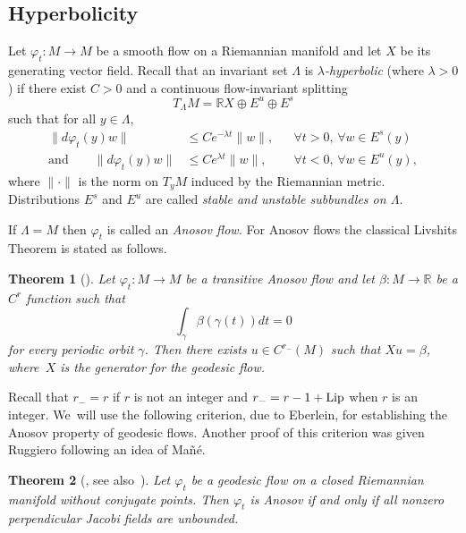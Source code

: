 \documentclass[10pt]{amsart}
\newtheorem{theorem}{Theorem}[section]
\theoremstyle{definition}
\newcommand{\field}[1]{\mathbb{#1}}
\newcommand{\R}{\field{R}}
\let\phi\varphi
\renewcommand{\>}{{\rangle}}
\newcommand{\<}{{\langle}}
\begin{document}
\subsection{Hyperbolicity} Let $\phi_t\colon M\to M$ be a smooth flow on a Riemannian manifold and let $X$ be its generating vector field.
Recall that an invariant set $\Lambda$ is \textit{$\lambda$-hyperbolic} (where $\lambda>0$) if there exist $C>0$ and a continuous flow-invariant splitting
\begin{equation*}
T_\Lambda M = \mathbb R X\oplus E^u\oplus E^s
\end{equation*}
such that for all $y\in\Lambda$,
\begin{equation}
\begin{aligned}
\|d\phi_t(y)w\|&\leq Ce^{-\lambda t}\|w\|, &&\forall t>0,\, \forall w\in E^s(y)\label{su_exp}\\
\text{and} \qquad\|d\phi_t(y)w\|&\leq Ce^{\lambda t}\|w\|, &&\forall t<0,\, \forall w\in E^u(y),
\end{aligned}
\end{equation}
where $\|{\cdot}\|$ is the norm on $T_yM$ induced by the Riemannian metric.
Distributions $E^s$ and $E^u$ are called \textit{stable and unstable subbundles on $\Lambda$}.

If $\Lambda=M$ then $\phi_t$ is called an {\it Anosov flow.} For Anosov flows the classical Livshits Theorem is stated as follows.
\begin{theorem}[\cite{L71, LMM86}]
\label{Liv}
Let $\varphi_t\colon M\to M$ be a transitive Anosov flow and let $\beta\colon M\to\R$ be a $C^r$ function such that
\[
\int_\gamma\beta(\gamma(t))dt=0
\]
for every periodic orbit $\gamma$. Then there exists $u\in C^{r_-}(M)$ such that $Xu=\beta$, where~$X$ is the generator for the geodesic flow.
\end{theorem}

Recall that $r_-=r$ if $r$ is not an integer and $r_-=r-1+\textup{Lip}$ when $r$ is an integer. We~will use the following criterion, due to Eberlein, for establishing the Anosov property of geodesic flows. Another proof of this criterion was given Ruggiero \cite{R07} following an idea of Mañé.

\begin{theorem}[\cite{E73}, see also~\cite{R07}]
\label{EberleinAnosov}
Let $\phi_t$ be a geodesic flow on a closed Riemannian
manifold without conjugate points. Then $\phi_t$ is Anosov if and only if all nonzero perpendicular Jacobi fields are unbounded. \end{theorem}
\end{document}

